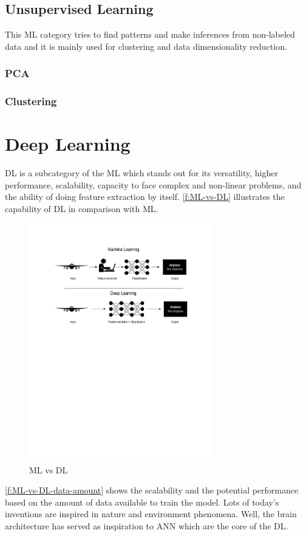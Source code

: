 \subsection{Unsupervised Learning}
This \ac{ML} category tries to find patterns and make inferences from non-labeled data and it is mainly used for clustering and data dimensionality reduction.  

\subsubsection{PCA}
\subsubsection{Clustering}


\section{Deep Learning}
\label{s:Second-Background-Deep-Learning}
\ac{DL} is a subcategory of the \ac{ML} which stands out for its versatility, higher performance, scalability, capacity to face complex and non-linear problems, and the ability of doing feature extraction by itself. \autoref{f:ML-vs-DL} illustrates the capability of \ac{DL} in comparison with \ac{ML}. 

\begin{figure}[h]
\centering
\includegraphics[width=8cm]{figures/Ch2/MLvsDL.pdf}
\caption{ML vs DL}
\label{f:ML-vs-DL}
\end{figure}

\autoref{f:ML-vs-DL-data-amount} shows the scalability and the potential performance based on the amount of data available to train the model. Lots of today's inventions are inspired in nature and environment phenomena. Well, the brain architecture has served as inspiration to \ac{ANN} which are the core of the \ac{DL}. 

